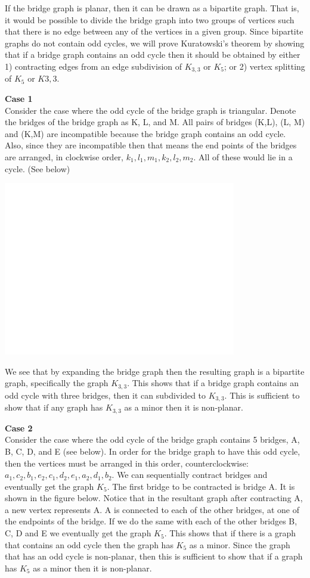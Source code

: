 If the bridge graph is planar, then it can be drawn as a bipartite graph. That is, it would be possible to divide the bridge graph into two groups of vertices such that there is no edge between any of the vertices in a given group. Since bipartite graphs do not contain odd cycles, we will prove Kuratowski's theorem by showing that if a bridge graph contains an odd cycle then it should be obtained by either 1) contracting edges from an edge subdivision of $K_{3,3}$ or $K_5$; or 2) vertex splitting of $K_5$ or $K{3,3}$.

\textbf{Case 1}\\
Consider the case where the odd cycle of the bridge graph is triangular. Denote the bridges of the bridge graph as K, L, and M. All pairs of bridges (K,L), (L, M) and (K,M) are incompatible because the bridge graph contains an odd cycle. Also, since they are incompatible then that means the end points of the bridges are arranged, in clockwise order, $k_1, l_1, m_1, k_2, l_2, m_2$.  All of these would lie in a cycle. (See below)

\includegraphics[height = 3in]{white.png}

We see that by expanding the bridge graph then the resulting graph is a bipartite graph, specifically the graph $K_{3,3}$. This shows that if a bridge graph contains an odd cycle with three bridges, then it can subdivided to $K_{3,3}$. This is sufficient to show that if any graph has $K_{3,3}$ as a minor then it is non-planar.

\textbf{Case 2}\\
Consider the case where the odd cycle of the bridge graph contains 5 bridges, A, B, C, D, and E (see below). In order for the bridge graph to have this odd cycle, then the vertices must be arranged in this order, counterclockwise: $a_1, c_2, b_1, e_2, c_1, d_2, e_1, a_2, d_1, b_2$.  We can sequentially contract bridges and eventually get the graph $K_5$. The first bridge to be contracted is bridge A. It is shown in the figure below. Notice that in the resultant graph after contracting A, a new vertex represents A.  A is connected to each of the other bridges, at one of the endpoints of the bridge. If we do the same with each of the other bridges B, C, D and E we eventually get the graph $K_5$.  This shows that if there is a graph that contains an odd cycle then the graph has $K_5$ as a minor. Since the graph that has an odd cycle is non-planar, then this is sufficient to show that if a graph has $K_5$ as a minor then it is non-planar. 

